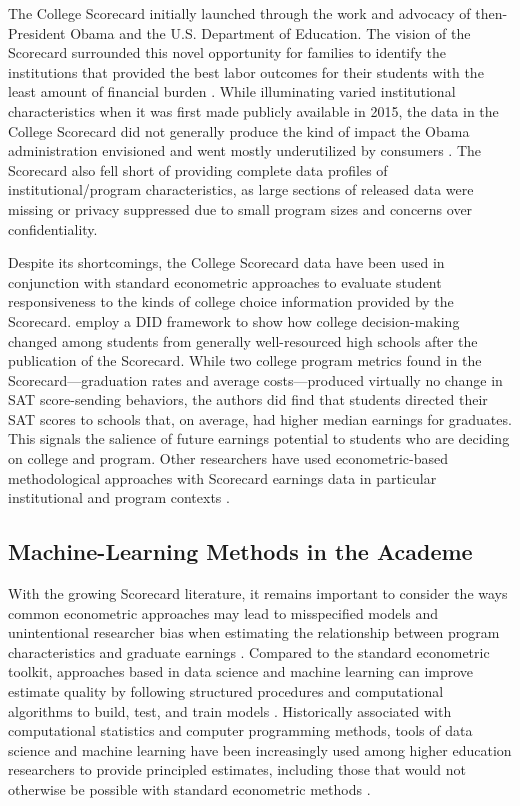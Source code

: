 \documentclass[a4paper, 12pt]{article}
\begin{document}
The College Scorecard initially launched through the work and advocacy of then-President Obama and the U.S. Department of Education. The vision of the Scorecard surrounded this novel opportunity for families to identify the institutions that provided the best labor outcomes for their students with the least amount of financial burden \parencite{obama_2013}. While illuminating varied institutional characteristics when it was first made publicly available in 2015, the data in the College Scorecard did not generally produce the kind of impact the Obama administration envisioned and went mostly underutilized by consumers \parencite{huntington2016search}. The Scorecard also fell short of providing complete data profiles of institutional/program characteristics, as large sections of released data were missing or privacy suppressed due to small program sizes and concerns over confidentiality.

Despite its shortcomings, the College Scorecard data have been used in conjunction with standard econometric approaches to evaluate student responsiveness to the kinds of college choice information provided by the Scorecard. \textcite{hurwitz_student_2018} employ a DID framework to show how college decision-making changed among students from generally well-resourced high schools after the publication of the Scorecard. While two college program metrics found in the Scorecard---graduation rates and average costs---produced virtually no change in SAT score-sending behaviors, the authors did find that students directed their SAT scores to schools that, on average, had higher median earnings for graduates. This signals the salience of future earnings potential to students who are deciding on college and program. Other researchers have used econometric-based methodological approaches with Scorecard earnings data in particular institutional and program contexts \parencite{boland_effect_2021, elu_earnings_2019, mabel_value_2020, seaman_assessing_2017}.

\subsection*{Machine-Learning Methods in the Academe}

With the growing Scorecard literature, it remains important to consider the ways common econometric approaches may lead to misspecified models and unintentional researcher bias when estimating the relationship between program characteristics and graduate earnings \parencite{Imbens_2004}. Compared to the standard econometric toolkit, approaches based in data science and machine learning can improve estimate quality by following structured procedures and computational algorithms to build, test, and train models \parencite{Hastie_etal_2016}. Historically associated with computational statistics and computer programming methods, tools of data science and machine learning have been increasingly used among higher education researchers to provide principled estimates, including those that would not otherwise be possible with standard econometric methods \parencite{skinner2021civic, aulck2017predicting, savvas_etal_2021, Zeineddine_2021}.
\end{document}
